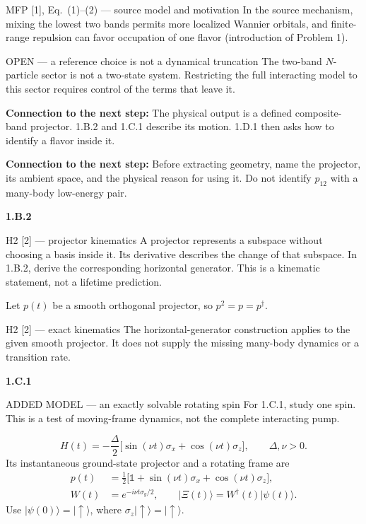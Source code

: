 \documentclass[11pt,a4paper]{article}
\newcommand{\ket}[1]{\lvert #1\rangle}
\newcommand{\id}{\mathds 1}
\begin{document}
\begin{greenbox}{MFP [1], Eq.~(1)--(2) --- source model and motivation}
In the source mechanism, mixing the lowest two bands permits more localized Wannier orbitals, and finite-range repulsion can favor occupation of one flavor (introduction of Problem 1).
\end{greenbox}
\begin{redbox}{OPEN --- a reference choice is not a dynamical truncation}
The two-band $N$-particle sector is not a two-state system. Restricting the full interacting model to this sector requires control of the terms that leave it.
\end{redbox}
{\small\textbf{Connection to the next step:} The physical output is a defined composite-band projector. 1.B.2 and 1.C.1 describe its motion. 1.D.1 then asks how to identify a flavor inside it.}\par
{\small\textbf{Connection to the next step:} Before extracting geometry, name the projector, its ambient space, and the physical reason for using it. Do not identify $p_{12}$ with a many-body low-energy pair.}\par
\par\medskip\textbf{1.B.2}\par
\begin{greenbox}{H2 [2] --- projector kinematics}
A projector represents a subspace without choosing a basis inside it. Its derivative describes the change of that subspace. In 1.B.2, derive the corresponding horizontal generator. This is a kinematic statement, not a lifetime prediction.

Let $p(t)$ be a smooth orthogonal projector, so $p^2=p=p^\dagger$.
\end{greenbox}
\begin{greenbox}{H2 [2] --- exact kinematics}
The horizontal-generator construction applies to the given smooth projector. It does not supply the missing many-body dynamics or a transition rate.
\end{greenbox}
\par\medskip\textbf{1.C.1}\par
\begin{redbox}{ADDED MODEL --- an exactly solvable rotating spin}
For 1.C.1, study one spin. This is a test of moving-frame dynamics, not the complete interacting pump.

\[
H(t)=-\frac{\Delta}{2}
\big[\sin(\nu t)\sigma_x+\cos(\nu t)\sigma_z\big],
\qquad \Delta,\nu>0.
\]
Its instantaneous ground-state projector and a rotating frame are
\[
\begin{split}
p(t)&=\tfrac12\big[\id+\sin(\nu t)\sigma_x+\cos(\nu t)\sigma_z\big],\\
W(t)&=e^{-i\nu t\sigma_y/2},\qquad
\ket{\Xi(t)}=W^\dagger(t)\ket{\psi(t)}.
\end{split}
\]
Use $\ket{\psi(0)}=\ket{\uparrow}$, where $\sigma_z\ket{\uparrow}=\ket{\uparrow}$.

\end{redbox}
\end{document}
